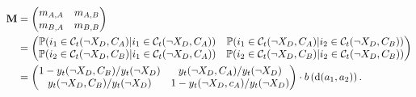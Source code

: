 \begin{align}
\label{eq:matrix_M}
\mathbf{M} &= \begin{pmatrix} 
m_{A,A} & m_{A,B} \\
m_{B,A} & m_{B,B} 
\end{pmatrix} \\
&= \begin{pmatrix} 
\mathbb{P}(i_1 \in \mathcal{C}_t(\neg X_D, C_A) | i_1 \in \mathcal{C}_t(\neg X_D, C_A) ) & \mathbb{P}(i_1 \in \mathcal{C}_t(\neg X_D, C_A) | i_2 \in \mathcal{C}_t(\neg X_D, C_B) ) \\
\mathbb{P}(i_2 \in \mathcal{C}_t(\neg X_D, C_B) | i_1 \in \mathcal{C}_t(\neg X_D, C_A) ) & \mathbb{P}(i_2 \in \mathcal{C}_t(\neg X_D, C_B) | i_2 \in \mathcal{C}_t(\neg X_D, C_B) )
\end{pmatrix} \notag \\
&= \begin{pmatrix} 
1 - y_t(\neg X_D, C_B) / y_t(\neg X_D)   & y_t(\neg X_D, C_A) / y_t(\neg X_D)  \\
y_t(\neg X_D, C_B) / y_t(\neg X_D)  & 1 - y_t(\neg X_D, c_A) / y_t(\neg X_D)
\end{pmatrix} \cdot b\left(\text{d}(a_1, a_2) \right). \notag
\end{align} 


